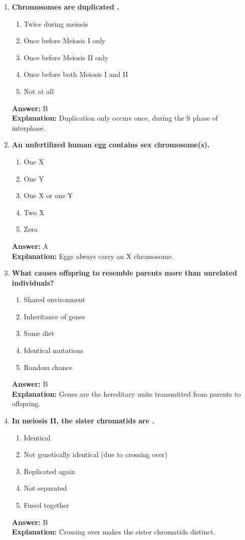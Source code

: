 \documentclass[11pt, a4paper]{article}
\begin{document}
\begin{enumerate}[leftmargin=*, label=\arabic*.]
\item \textbf{Chromosomes are duplicated \underline{\hspace{1cm}}.}
\begin{enumerate}[label=\Alph*.]
\item Twice during meiosis
\item Once before Meiosis I only
\item Once before Meiosis II only
\item Once before both Meiosis I and II
\item Not at all
\end{enumerate}
\textbf{Answer:} B \\
\textbf{Explanation:} Duplication only occurs once, during the S phase of interphase.

\item \textbf{An unfertilized human egg contains \underline{\hspace{1cm}} sex chromosome(s).}
\begin{enumerate}[label=\Alph*.]
\item One X
\item One Y
\item One X or one Y
\item Two X
\item Zero
\end{enumerate}
\textbf{Answer:} A \\
\textbf{Explanation:} Eggs always carry an X chromosome.

\item \textbf{What causes offspring to resemble parents more than unrelated individuals?}
\begin{enumerate}[label=\Alph*.]
\item Shared environment
\item Inheritance of genes
\item Same diet
\item Identical mutations
\item Random chance
\end{enumerate}
\textbf{Answer:} B \\
\textbf{Explanation:} Genes are the hereditary units transmitted from parents to offspring.

\item \textbf{In meiosis II, the sister chromatids are \underline{\hspace{1cm}}.}
\begin{enumerate}[label=\Alph*.]
\item Identical
\item Not genetically identical (due to crossing over)
\item Replicated again
\item Not separated
\item Fused together
\end{enumerate}
\textbf{Answer:} B \\
\textbf{Explanation:} Crossing over makes the sister chromatids distinct.


\end{enumerate}
\end{document}
